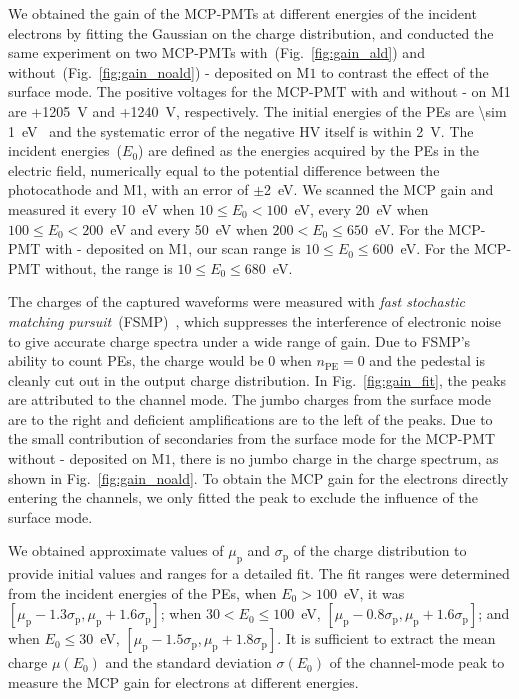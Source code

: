 We obtained the gain of the MCP-PMTs at different energies of the incident electrons by fitting the Gaussian on the charge distribution,
and conducted the same experiment on two MCP-PMTs with~(Fig.~\ref{fig:gain_ald}) and without~(Fig.~\ref{fig:gain_noald})
- deposited on $\mathrm{M}1$ to contrast the effect of the surface mode.
The positive voltages for the MCP-PMT with and without - on M1 are +\SI{1205}{V} and  +\SI{1240}{V}, respectively.
The initial energies of the PEs are \SI{\sim 1}{eV}~\cite{Nathan1970TheED}
and the systematic error of the negative HV itself is within \SI{2}{V}.
The incident energies~($E_0$) are defined as the energies acquired by the PEs in the electric field,
numerically equal to the potential difference between the photocathode and M1, with an error of $\pm$\SI{2}{eV}.
We scanned the MCP gain and measured it every \SI{10}{eV} when $10\leqslant E_0<100$~\si{eV}, every \SI{20}{eV} when $100\leqslant E_0<200$~\si{eV}
and every \SI{50}{eV} when $200<E_0\leqslant 650$~\si{eV}.
For the MCP-PMT with - deposited on M1, our scan range is $10\leqslant E_0\leqslant 600$~\si{eV}.
For the MCP-PMT without, the range is $10\leqslant E_0\leqslant 680$~\si{eV}.

The charges of the captured waveforms were measured with \emph{fast stochastic matching pursuit}~(FSMP)~\cite{Xu_2022,Wang_2024},
which suppresses the interference of electronic noise to give accurate charge spectra under a wide range of gain.
Due to FSMP's ability to count PEs, the charge would be 0 when $n_{\mathrm{PE}}=0$
and the pedestal is cleanly cut out in the output charge distribution.
In Fig.~\ref{fig:gain_fit}, the peaks are attributed to the channel mode.
The jumbo charges from the surface mode are to the right and deficient amplifications
are to the left of the peaks.
Due to the small contribution of secondaries from the surface mode for the MCP-PMT without - deposited on $\mathrm{M}1$,
there is no jumbo charge in the charge spectrum, as shown in Fig.~\ref{fig:gain_noald}.
To obtain the MCP gain for the electrons directly entering the channels,
we only fitted the peak to exclude the influence of the surface mode.

We obtained approximate values of $\mu_{\mathrm{p}}$ and $\sigma_{\mathrm{p}}$ of the charge distribution to
provide initial values and ranges for a detailed fit.
The fit ranges were determined from the incident energies of the PEs,
when $E_0>100$~\si{eV}, it was $[\mu_{\mathrm{p}}-1.3\sigma_{\mathrm{p}}, \mu_{\mathrm{p}}+1.6\sigma_{\mathrm{p}}]$;
when $30<E_0\leqslant 100$~\si{eV}, $[\mu_{\mathrm{p}}-0.8\sigma_{\mathrm{p}}, \mu_{\mathrm{p}}+1.6\sigma_{\mathrm{p}}]$;
and when $E_0\leqslant 30$~\si{eV}, $[\mu_{\mathrm{p}}-1.5\sigma_{\mathrm{p}}, \mu_{\mathrm{p}}+1.8\sigma_{\mathrm{p}}]$.
It is sufficient to extract the mean charge $\mu(E_0)$ and the standard deviation $\sigma(E_0)$
of the channel-mode peak to measure the MCP gain for electrons at different energies.

